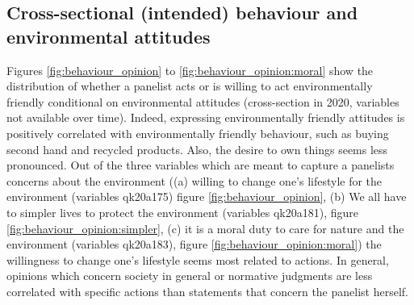 \documentclass[12pt]{article}
\begin{document}
\subsection{Cross-sectional (intended) behaviour and environmental attitudes}\label{subsec:cs}
Figures \ref{fig:behaviour_opinion} to \ref{fig:behaviour_opinion:moral} show the distribution of whether a panelist acts or is willing to act environmentally friendly conditional on environmental attitudes (cross-section in 2020, variables not available over time). Indeed, expressing environmentally friendly attitudes is positively correlated with environmentally friendly behaviour, such as buying second hand and recycled products. Also, the desire to own things seems less pronounced.  
Out of the three variables which are meant to capture a panelists concerns about the environment ((a) willing to change one's lifestyle for the environment (variables qk20a175) figure \ref{fig:behaviour_opinion}, (b) We all have to simpler lives to protect the environment (variables qk20a181), figure \ref{fig:behaviour_opinion:simpler}, (c) it is a moral duty to care for nature and the environment (variables qk20a183), figure \ref{fig:behaviour_opinion:moral})
 the willingness to change one's lifestyle seems most related to actions. In general, opinions which concern society in general or normative judgments are less correlated with specific actions than statements that concern the panelist herself. 
\end{document}
